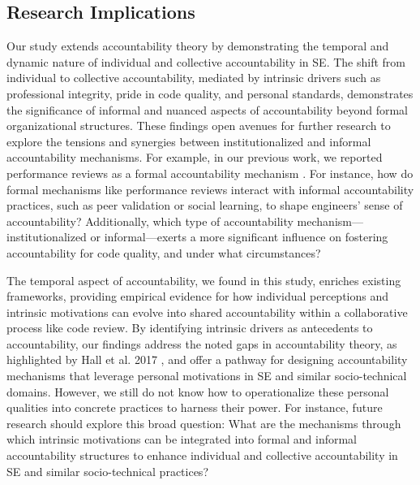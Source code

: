 \subsection{Research Implications}

Our study extends accountability theory by demonstrating the temporal and dynamic nature of individual and collective accountability in SE. The shift from individual to collective accountability, mediated by intrinsic drivers such as professional integrity, pride in code quality, and personal standards, demonstrates the significance of informal and nuanced aspects of accountability beyond formal organizational structures. These findings open avenues for further research to explore the tensions and synergies between institutionalized and informal accountability mechanisms. For example, in our previous work, we reported performance reviews as a formal accountability mechanism \citep{alami2024understanding}. For instance, how do formal mechanisms like performance reviews interact with informal accountability practices, such as peer validation or social learning, to shape engineers' sense of accountability? Additionally, which type of accountability mechanism---institutionalized or informal---exerts a more significant influence on fostering accountability for code quality, and under what circumstances?

The temporal aspect of accountability, we found in this study, enriches existing frameworks, providing empirical evidence for how individual perceptions and intrinsic motivations can evolve into shared accountability within a collaborative process like code review. By identifying intrinsic drivers as antecedents to accountability, our findings address the noted gaps in accountability theory, as highlighted by Hall et al. 2017 \citep{hall2017accountability}, and offer a pathway for designing accountability mechanisms that leverage personal motivations in SE and similar socio-technical domains. However, we still do not know how to operationalize these personal qualities into concrete practices to harness their power. For instance, future research should explore this broad question: What are the mechanisms through which intrinsic motivations can be integrated into formal and informal accountability structures to enhance individual and collective accountability in SE and similar socio-technical practices?

